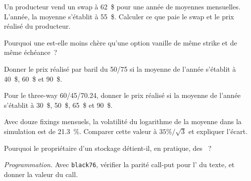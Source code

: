 \begin{exercise}[$\star$]\label{exo:m3:commodity-options-and-structured-hedges:1}
Un producteur vend un swap à 62~\$ pour une année de moyennes mensuelles. L'année, la moyenne s'établit à 55~\$. Calculer ce que paie
le swap et le prix réalisé du producteur.
\end{exercise}

\begin{exercise}[$\star$]\label{exo:m3:commodity-options-and-structured-hedges:2}
Pourquoi une  est-elle moins chère qu'une option vanille de même strike et de même échéance~?
\end{exercise}

\begin{exercise}[$\star$]\label{exo:m3:commodity-options-and-structured-hedges:3}
Donner le prix réalisé par baril du  50/75 si la moyenne de l'année s'établit à 40~\$, 60~\$ et 90~\$.
\end{exercise}

\begin{exercise}[$\star\star$]\label{exo:m3:commodity-options-and-structured-hedges:4}
Pour le three-way 60/45/70.24, donner le prix réalisé si la moyenne de l'année s'établit à 30~\$, 50~\$, 65~\$ et 90~\$.
\end{exercise}

\begin{exercise}[$\star\star$]\label{exo:m3:commodity-options-and-structured-hedges:5}
Avec douze fixings mensuels, la volatilité du logarithme de la moyenne dans la simulation est de 21.3~\%. Comparer
cette valeur à $35\%/\sqrt3$ et expliquer l'écart.
\end{exercise}

\begin{exercise}[$\star\star$]\label{exo:m3:commodity-options-and-structured-hedges:6}
Pourquoi le propriétaire d'un stockage détient-il, en pratique, des ~?
\end{exercise}

\begin{exercise}[$\star\star\star$]\label{exo:m3:commodity-options-and-structured-hedges:7}
\emph{Programmation.} Avec \texttt{black76}, vérifier la parité call-put pour l' du texte, et donner
la valeur du call.
\end{exercise}

